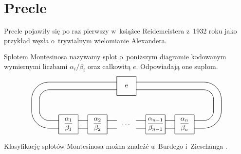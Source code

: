 \section{Precle} %
Precle pojawiły się po raz pierwszy w~książce Reidemeistera z~1932 roku jako przykład węzła o~trywialnym wielomianie Alexandera.

\label{sec:pretzel}
\begin{definition}
	Splotem Montesinosa nazywamy splot o~poniższym diagramie
	kodowanym wymiernymi liczbami $\alpha_i/\beta_i$ oraz całkowitą $e$.
	Odpowiadają one supłom.
	\[
	\begin{tikzpicture}[baseline=-0.65ex, scale=0.1]
		\draw[semithick] (-5, 5) rectangle (5, 15);
		\foreach \x in {0,1,3,4} {
			\draw[semithick] (15*\x-35, -15) rectangle (15*\x-25, -5);
		}
		\foreach \x in {0,1,2,3,4,5} {
			\draw[semithick] (15*\x-35, -8) to (15*\x-40, -8);
			\draw[semithick] (15*\x-35, -12) to (15*\x-40, -12);
		}
		\draw[semithick] (-40, -8) [in=down, out=left] to (-45, -3);
		\draw[semithick] (-40, -12) [in=down, out=left] to (-49, -3);

		\draw[semithick] (-40, 8) [in=up, out=left] to (-45, 3);
		\draw[semithick] (-40, 12) [in=up, out=left] to (-49, 3);

		\draw[semithick] (40, 8) [in=up, out=right] to (45, 3);
		\draw[semithick] (40, 12) [in=up, out=right] to (49, 3);

		\draw[semithick] (40, -8) [in=down, out=right] to (45, -3);
		\draw[semithick] (40, -12) [in=down, out=right] to (49, -3);

		\draw[semithick] (-45, -3)  to (-45, 3);
		\draw[semithick] (-49, -3)  to (-49, 3);
		\draw[semithick] (45, -3)  to (45, 3);
		\draw[semithick] (49, -3)  to (49, 3);

		\draw[semithick] (-5, 8)  to (-40, 8);
		\draw[semithick] ( 5, 8)  to ( 40, 8);
		\draw[semithick] (-5, 12)  to (-40, 12);
		\draw[semithick] ( 5, 12)  to ( 40, 12);

		\node at (0, 10) {e};
		\node at (0, -10) {\ldots};
		\node at (-15, -10) {$\displaystyle \frac{\alpha_2}{\beta_2}$};
		\node at (-30, -10) {$\displaystyle \frac{\alpha_1}{\beta_1}$};
		\node at (15, -10) {$\displaystyle \frac{\alpha_{n-1}}{\beta_{n-1}}$};
		\node at (30, -10) {$\displaystyle \frac{\alpha_n}{\beta_n}$};
	\end{tikzpicture}
	\]
\end{definition}

Klasyfikację splotów Montesinosa można znaleźć u~Burdego i~Zieschanga \cite{burde85}.

